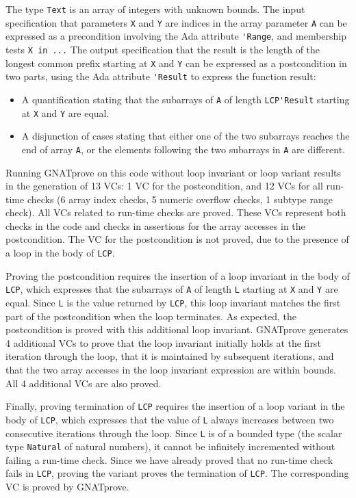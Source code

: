 \documentclass[sttt,draft]{svjour}
\newcommand{\gnatprove}{GNATprove\xspace}
\begin{document}
The type \verb|Text| is an array of integers with unknown bounds. The input
specification that parameters \verb|X| and \verb|Y| are indices in the array
parameter \verb|A| can be expressed as a precondition involving the Ada
attribute \verb|'Range|, and membership tests \verb|X in ...| The output
specification that the result is the length of the longest common prefix
starting at \verb|X| and \verb|Y| can be expressed as a postcondition in two
parts, using the Ada attribute \verb|'Result| to express the function result:
\begin{itemize}
\item A quantification stating that the subarrays of \verb|A| of length
  \verb|LCP'Result| starting at \verb|X| and \verb|Y| are equal.
\item A disjunction of cases stating that either one of the two subarrays
  reaches the end of array \verb|A|, or the elements following the two
  subarrays in \verb|A| are different.
\end{itemize}

Running \gnatprove on this code without loop invariant or loop variant results
in the generation of 13 VCs: 1 VC for the postcondition, and 12 VCs for all
run-time checks (6 array index checks, 5 numeric overflow checks, 1 subtype
range check). All VCs related to run-time checks are proved. These VCs
represent both checks in the code and checks in assertions for the array
accesses in the postcondition. The VC for the postcondition is not proved, due
to the presence of a loop in the body of \verb|LCP|.

Proving the postcondition requires the insertion of a loop invariant in the
body of \verb|LCP|, which expresses that the subarrays of \verb|A| of length
\verb|L| starting at \verb|X| and \verb|Y| are equal. Since \verb|L| is the
value returned by \verb|LCP|, this loop invariant matches the first part of the
postcondition when the loop terminates. As expected, the postcondition is
proved with this additional loop invariant. \gnatprove generates 4 additional
VCs to prove that the loop invariant initially holds at the first iteration
through the loop, that it is maintained by subsequent iterations, and that the
two array accesses in the loop invariant expression are within bounds. All 4
additional VCs are also proved.

Finally, proving termination of \verb|LCP| requires the insertion of a loop
variant in the body of \verb|LCP|, which expresses that the value of \verb|L|
always increases between two consecutive iterations through the loop. Since
\verb|L| is of a bounded type (the scalar type \verb|Natural| of natural
numbers), it cannot be infinitely incremented without failing a run-time
check. Since we have already proved that no run-time check fails in \verb|LCP|,
proving the variant proves the termination of \verb|LCP|. The corresponding VC
is proved by \gnatprove.
\end{document}
